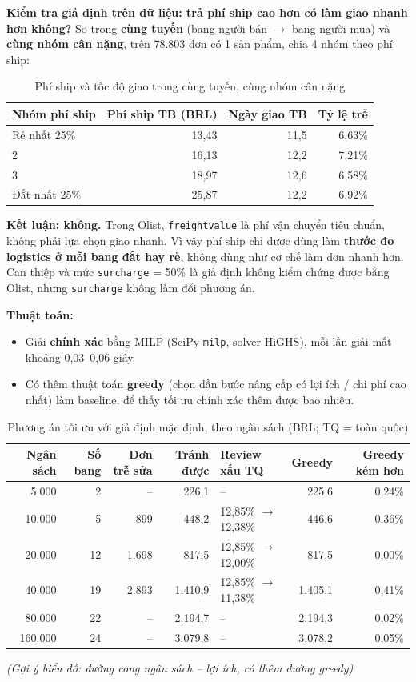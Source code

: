 \documentclass[12pt,a4paper]{report}
\newcommand{\bieudo}[1]{\par{\small\textit{(Gợi ý biểu đồ: #1)}}\par}
\newcommand{\code}[1]{\texttt{#1}}
\renewcommand{\_}{\oldunderscore\allowbreak}
\begin{document}
\textbf{Kiểm tra giả định trên dữ liệu: trả phí ship cao hơn có làm giao nhanh hơn không?} So trong \textbf{cùng tuyến} (bang người bán $\rightarrow$ bang người mua) và \textbf{cùng nhóm cân nặng}, trên 78.803 đơn có 1 sản phẩm, chia 4 nhóm theo phí ship:

\begin{table}[H]
\centering\small
\caption{Phí ship và tốc độ giao trong cùng tuyến, cùng nhóm cân nặng}
\begin{tabular}{lrrr}
\toprule
Nhóm phí ship & Phí ship TB (BRL) & Ngày giao TB & Tỷ lệ trễ \\
\midrule
Rẻ nhất 25\% & 13,43 & 11,5 & 6,63\% \\
2 & 16,13 & 12,2 & 7,21\% \\
3 & 18,97 & 12,6 & 6,58\% \\
Đắt nhất 25\% & 25,87 & 12,2 & 6,92\% \\
\bottomrule
\end{tabular}
\end{table}

\textbf{Kết luận: không.} Trong Olist, \code{freight\_value} là phí vận chuyển tiêu chuẩn, không phải lựa chọn giao nhanh. Vì vậy phí ship chỉ được dùng làm \textbf{thước đo logistics ở mỗi bang đắt hay rẻ}, không dùng như cơ chế làm đơn nhanh hơn. Can thiệp và mức \code{surcharge} = 50\% là giả định không kiểm chứng được bằng Olist, nhưng \code{surcharge} không làm đổi phương án.

\textbf{Thuật toán:}
\begin{itemize}
\item Giải \textbf{chính xác} bằng MILP (SciPy \code{milp}, solver HiGHS), mỗi lần giải mất khoảng 0,03--0,06 giây.
\item Có thêm thuật toán \textbf{greedy} (chọn dần bước nâng cấp có lợi ích / chi phí cao nhất) làm baseline, để thấy tối ưu chính xác thêm được bao nhiêu.
\end{itemize}

\begin{table}[H]
\centering\small
\setlength{\tabcolsep}{4pt}
\caption{Phương án tối ưu với giả định mặc định, theo ngân sách (BRL; TQ = toàn quốc)}
\begin{tabular}{rrrrlrr}
\toprule
Ngân sách & Số bang & Đơn trễ sửa & Tránh được & Review xấu TQ & Greedy & Greedy kém hơn \\
\midrule
5.000 & 2 & -- & 226,1 & -- & 225,6 & 0,24\% \\
10.000 & 5 & 899 & 448,2 & 12,85\% $\rightarrow$ 12,38\% & 446,6 & 0,36\% \\
20.000 & 12 & 1.698 & 817,5 & 12,85\% $\rightarrow$ 12,00\% & 817,5 & 0,00\% \\
40.000 & 19 & 2.893 & 1.410,9 & 12,85\% $\rightarrow$ 11,38\% & 1.405,1 & 0,41\% \\
80.000 & 22 & -- & 2.194,7 & -- & 2.194,3 & 0,02\% \\
160.000 & 24 & -- & 3.079,8 & -- & 3.078,2 & 0,05\% \\
\bottomrule
\end{tabular}
\end{table}
\bieudo{đường cong ngân sách -- lợi ích, có thêm đường greedy}
\end{document}
